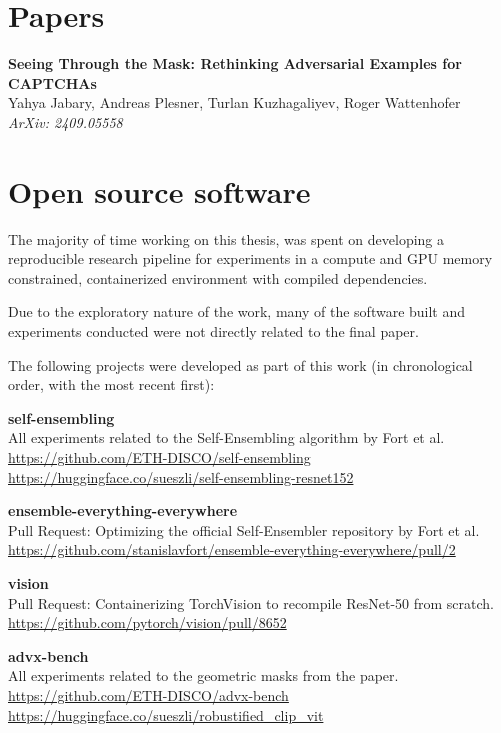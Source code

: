 \documentclass[a4paper, oneside]{discothesis}
\newcommand{\linebreaks}{\vspace*{0.5em}}
\begin{document}
\section*{Papers}

\textbf{Seeing Through the Mask: Rethinking Adversarial Examples for CAPTCHAs} \\
Yahya Jabary, Andreas Plesner, Turlan Kuzhagaliyev, Roger Wattenhofer \\
\textit{ArXiv: 2409.05558}

\section*{Open source software}

The majority of time working on this thesis, was spent on developing a reproducible research pipeline for experiments in a compute and GPU memory constrained, containerized environment with compiled dependencies.

Due to the exploratory nature of the work, many of the software built and experiments conducted were not directly related to the final paper.

The following projects were developed as part of this work (in chronological order, with the most recent first):

\linebreaks

\textbf{self-ensembling} \\
All experiments related to the Self-Ensembling algorithm by Fort et al. \\
\url{https://github.com/ETH-DISCO/self-ensembling} \\
\url{https://huggingface.co/sueszli/self-ensembling-resnet152}

\linebreaks

\textbf{ensemble-everything-everywhere} \\
Pull Request: Optimizing the official Self-Ensembler repository by Fort et al. \\
\url{https://github.com/stanislavfort/ensemble-everything-everywhere/pull/2}

\linebreaks

\textbf{vision} \\
Pull Request: Containerizing TorchVision to recompile ResNet-50 from scratch. \\
\url{https://github.com/pytorch/vision/pull/8652}

\linebreaks

\textbf{advx-bench} \\
All experiments related to the geometric masks from the paper. \\
\url{https://github.com/ETH-DISCO/advx-bench} \\
\url{https://huggingface.co/sueszli/robustified_clip_vit}
\end{document}
